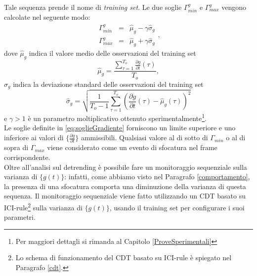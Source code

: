 Tale sequenza prende il nome di \textit{training set}.
Le due soglie $\Gamma_{min}^g$ e $\Gamma_{max}^g$ vengono calcolate nel seguente modo:
\begin{equation}
\label{eq:soglieGradiente}
\begin{array}{lcl}
\Gamma_{min}^g & = & \widehat{\mu}_g -\gamma \widehat{\sigma}_g\\
\Gamma_{max}^g & = & \widehat{\mu}_g + \gamma \widehat{\sigma}_g
\end{array},
\end{equation}
dove $\widehat{\mu}_g$ indica il valore medio delle osservazioni del training set
\begin{equation}
	\widehat{\mu}_g = \frac{\sum_{\tau = 1}^{T_{o}} \frac{\partial g}{\partial t}(\tau)}{T_{o}}, \nonumber
\end{equation}
$\widehat{\sigma}_g$ indica la deviazione standard delle osservazioni del training set
\begin{equation}
\widehat{\sigma}_g  = \sqrt{\frac{1}{T_{o}-1}\sum_{\tau=1}^{T_{o}}\left(\frac{\partial g}{\partial t}(\tau) - \widehat{\mu}_g(\tau)\right)^2} \nonumber
\end{equation}
e $\gamma>1$ \`e un parametro moltiplicativo ottenuto sperimentalmente\footnote{Per maggiori dettagli si rimanda al Capitolo \ref{ProveSperimentali}}.\\
Le soglie definite in \eqref{eq:soglieGradiente} forniscono un limite superiore e uno inferiore ai valori di $\{\frac{\partial g}{\partial t}\}$ ammissibili.
Qualsiasi valore al di sotto di $\Gamma_{min}$ o al di sopra di $\Gamma_{max}$ viene considerato come un evento di sfocatura nel frame corrispondente.\\ 
Oltre all'analisi sul detrending \`e possibile fare un monitoraggio sequenziale sulla varianza di $\{g(t)\}$: infatti, come abbiamo visto nel Paragrafo \ref{comportamento}, la presenza di una sfocatura comporta una diminuzione della varianza di questa sequenza.
Il monitoraggio sequenziale viene fatto utilizzando un CDT basato su ICI-rule\footnote{Lo schema di funzionamento del CDT basato su ICI-rule \`e spiegato nel Paragrafo \ref{cdt}.} sulla varianza di $\{g(t)\}$, usando il training set per configurare i suoi parametri.


